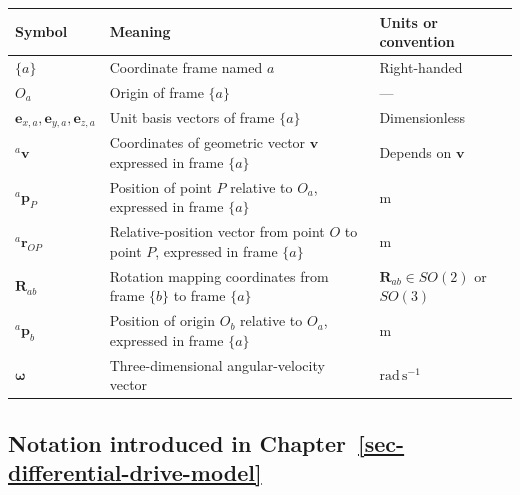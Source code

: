 \documentclass[
  australian,
  12pt,
  letterpaper,
  DIV=11,
  numbers=noendperiod,
  twoside]{scrreprt}
\newcounter{none} %
\begin{document}
{\def\LTcaptype{none} %
\begin{longtable}[]{@{}
  >{\raggedright\arraybackslash}p{}
  >{\raggedright\arraybackslash}p{}
  >{\raggedright\arraybackslash}p{}@{}}
\toprule\noalign{}
\begin{minipage}[b]{\linewidth}\raggedright
Symbol
\end{minipage} & \begin{minipage}[b]{\linewidth}\raggedright
Meaning
\end{minipage} & \begin{minipage}[b]{\linewidth}\raggedright
Units or convention
\end{minipage} \\
\midrule\noalign{}
\endhead
\bottomrule\noalign{}
\endlastfoot
\(\{a\}\) & Coordinate frame named \(a\) & Right-handed \\
\(O_a\) & Origin of frame \(\{a\}\) & --- \\
\(\mathbf{e}_{x,a},\mathbf{e}_{y,a},\mathbf{e}_{z,a}\) & Unit basis
vectors of frame \(\{a\}\) & Dimensionless \\
\({}^{a}\mathbf{v}\) & Coordinates of geometric vector \(\mathbf{v}\)
expressed in frame \(\{a\}\) & Depends on \(\mathbf{v}\) \\
\({}^{a}\mathbf{p}_P\) & Position of point \(P\) relative to \(O_a\),
expressed in frame \(\{a\}\) & \(\mathrm{m}\) \\
\({}^{a}\mathbf r_{OP}\) & Relative-position vector from point \(O\) to
point \(P\), expressed in frame \(\{a\}\) & \(\mathrm{m}\) \\
\(\mathbf{R}_{ab}\) & Rotation mapping coordinates from frame \(\{b\}\)
to frame \(\{a\}\) & \(\mathbf{R}_{ab}\in SO(2)\) or \(SO(3)\) \\
\({}^{a}\mathbf{p}_b\) & Position of origin \(O_b\) relative to \(O_a\),
expressed in frame \(\{a\}\) & \(\mathrm{m}\) \\
\(\boldsymbol\omega\) & Three-dimensional angular-velocity vector &
\(\mathrm{rad\,s^{-1}}\) \\
\end{longtable}
}

\subsection*{\texorpdfstring{Notation introduced in
Chapter~\ref{sec-differential-drive-model}}{Notation introduced in Chapter~}}\label{notation-introduced-in-sec-differential-drive-model}
\end{document}
